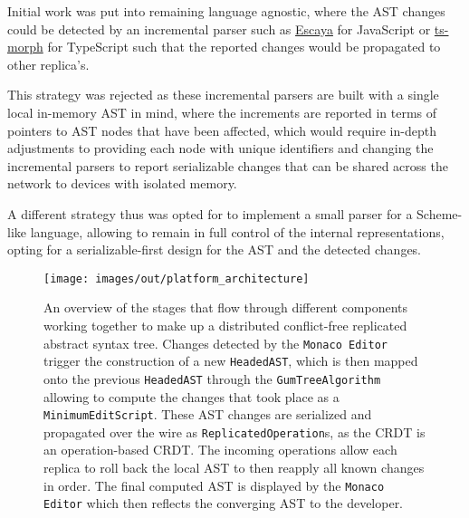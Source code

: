 \begin{tcolorbox}[title=Approach motivation]
    \label{example:racecondition}
    Initial work was put into remaining language agnostic, where the AST changes could be detected by an
    incremental parser such as \href{https://www.npmjs.com/package/escaya}{Escaya} for JavaScript or
    \href{https://ts-morph.com}{ts-morph} for TypeScript such that the reported changes would be propagated to other
    replica's.

    This strategy was rejected as these incremental parsers are built with a single local in-memory AST in mind, where
    the increments are reported in terms of pointers to AST nodes that have been affected, which would require in-depth
    adjustments to providing each node with unique identifiers and changing the incremental parsers to report
    serializable changes that can be shared across the network to devices with isolated memory.

    A different strategy thus was opted for to implement a small parser for a Scheme-like language,
    allowing to remain in full control of the internal representations, opting for a serializable-first design for the
    AST and the detected changes.
\end{tcolorbox}


\begin{figure*}
    \centering
    \texttt{[image: images/out/platform\_architecture]}
    \caption{
        An overview of the stages that flow through different components working together to make up a distributed
        conflict-free replicated abstract syntax tree. Changes detected by the \texttt{Monaco Editor}
        trigger the construction of a new \texttt{HeadedAST}, which is then mapped onto the previous
        \texttt{HeadedAST} through the \texttt{GumTreeAlgorithm} allowing to compute the changes
        that took place as a \texttt{MinimumEditScript}.
        These AST changes are serialized and propagated over the wire as \texttt{ReplicatedOperation}s, as
        the CRDT is an operation-based CRDT.
        The incoming operations allow each replica to roll back the local AST to then reapply all known changes in order.
        The final computed AST is displayed by the \texttt{Monaco Editor} which then reflects the
        converging AST to the developer.
    }
    \label{fig:platform-architecture}
\end{figure*}

